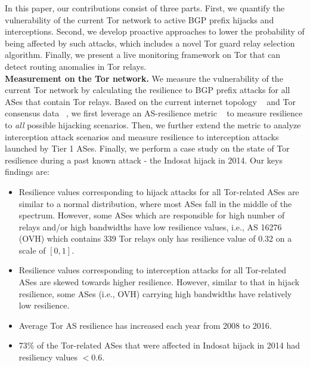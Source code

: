 In this paper, our contributions consist of three parts. First, we quantify the vulnerability of the current Tor network to active BGP prefix hijacks and interceptions. Second, we develop proactive approaches to lower the probability of being affected by such attacks, which includes a novel Tor guard relay selection algorithm. Finally, we present a live monitoring framework on Tor that can detect routing anomalies in Tor relays. 
\\
\textbf{Measurement on the Tor network.} We measure the vulnerability of the current Tor network by calculating the resilience to BGP prefix attacks for all ASes that contain Tor relays. Based on the current internet topology ~\cite{topology} and Tor consensus data ~\cite{torconsensus}, we first leverage an AS-resilience metric ~\cite{lad2007understanding} to measure resilience to \emph{all} possible hijacking scenarios. Then, we further extend the metric to analyze interception attack scenarios and measure resilience to interception attacks launched by Tier 1 ASes. Finally, we perform a case study on the state of Tor resilience during a past known attack - the Indosat hijack in 2014. Our keys findings are:
\begin{itemize}
\item Resilience values corresponding to hijack attacks for all Tor-related ASes are similar to a normal distribution, where most ASes fall in the middle of the spectrum. However, some ASes which are responsible for high number of relays and/or high bandwidths have low resilience values, i.e., AS 16276 (OVH) which contains 339 Tor relays only has resilience value of 0.32 on a scale of $[0,1]$.
\item Resilience values corresponding to interception attacks for all Tor-related ASes are skewed towards higher resilience. However, similar to that in hijack resilience, some ASes (i.e., OVH) carrying high bandwidths have relatively low resilience. 
\item Average Tor AS resilience has increased each year from 2008 to 2016. 
\item 73\% of the Tor-related ASes that were affected in Indosat hijack in 2014 had resiliency values $< 0.6$.
\end{itemize}
